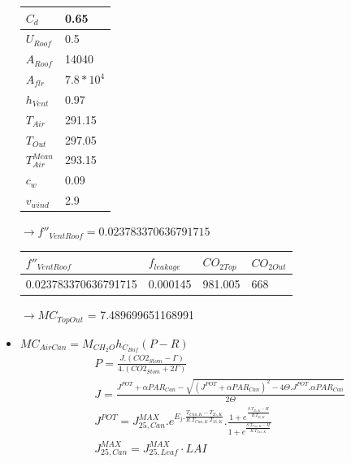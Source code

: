 \documentclass[a4paper]{article}
\numberwithin{equation}{section}
\begin{document}
\begin{itemize}
\begin{table}[H]
\centering
\begin{tabular}{|l|l|}
\hline
\textbf{$C_d$} & 0.65\\
\hline
\textbf{$U_{Roof}$} & 0.5\\
\hline
\textbf{$A_{Roof}$} & 14040\\
\hline
\textbf{$A_{flr}$} & $7.8*10^4$\\
\hline
\textbf{$h_{Vent}$}& 0.97\\
\hline
\textbf{$T_{Air}$}& 291.15\\
\hline
\textbf{$T_{Out}$}& 297.05\\
\hline
\textbf{$T_{Air}^{Mean}$}& 293.15\\
\hline
\textbf{$c_w$}& 0.09\\
\hline
\textbf{$v_{wind}$}& 2.9\\ 
\hline
\end{tabular}
\end{table}

$\rightarrow f''_{VentRoof} = 0.023783370636791715$

\begin{table}[H]
\centering
\begin{tabular}{|l|l|l|l|}
\hline
\rowcolor[HTML]{FFFC9E} 
\textbf{$f''_{VentRoof}$} & \textbf{$f_{leakage}$} & \cellcolor[HTML]{FFFC9E}\textbf{$CO_{2Top}$} & \cellcolor[HTML]{FFFC9E}\textbf{$CO_{2Out}$} \\ \hline
    0.023783370636791715               &    0.000145                  &                   981.005                      &          668                             \\ \hline
\end{tabular}
\end{table}

$\rightarrow MC_{TopOut}$ = 7.489699651168991 

\item $MC_{AirCan} = M_{CH_2O} h_{C_{Buf}} (P - R)$
\begin{align*}
  &P = \frac{J.(CO2_{Stom}-\Gamma)}{4.(CO2_{Stom} + 2\Gamma)} \\
  &J = \frac{J^{POT}+\alpha PAR_{Can} - \sqrt{(J^{POT} + \alpha PAR_{Can})^2 - 4\Theta.J^{POT}.\alpha PAR_{Can}} }{2\Theta} \\
  &J^{POT} = J^{MAX}_{25,Can}.e^{E_j.\frac{T_{Can,K}-T_{25,K}}{R.T_{Can,K}.T_{25,K}}}.\frac{1+e^{\frac{S.T_{25,K}-H}{R.T_{25,K}}}}{1+e^{\frac{S.T_{Can,K}-H}{R.T_{Can,K}}}}\\
  &J^{MAX}_{25,Can} = J^{MAX}_{25,Leaf} \cdot LAI
\end{align*}


\end{itemize}
\end{document}

